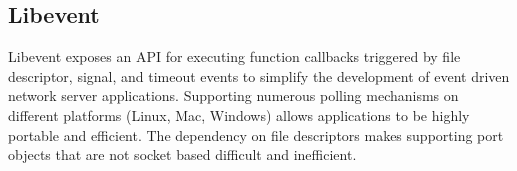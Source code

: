 \subsection{Libevent}
\label{related:libevent}
Libevent \cite{libevent} exposes an API for executing function callbacks
triggered by file descriptor, signal, and timeout events to simplify the
development of event driven network server applications. Supporting numerous
polling mechanisms on different platforms (Linux, Mac, Windows) allows
applications to be highly portable and efficient. The dependency on file
descriptors makes supporting port objects that are not socket based difficult
and inefficient.

